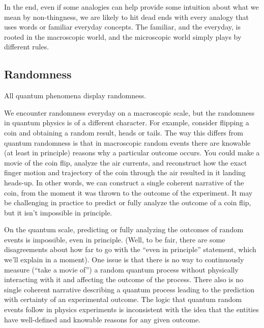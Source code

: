 \documentclass[onecolumn,preprintnumbers,amsmath,amssymbn,reprint,nofootinbib,superscriptaddress]{revtex4}    %
\begin{document}
In the end, even if some analogies can help provide some intuition about what we mean by non-thingness, we are likely to hit dead ends with every analogy that uses words or familiar everyday concepts.  The familiar, and the everyday, is rooted in the macroscopic world, and the microscopic world simply plays by different rules.

\par 
\subsection{Randomness}
%
All quantum phenomena display randomness.  

We encounter randomness everyday on a macroscopic scale, but the randomness in quantum physics is of a different character.  For example, consider flipping a coin and obtaining a random result, heads or tails.  The way this differs from quantum randomness is that in macroscopic random events there are knowable (at least in principle) reasons why a particular outcome occurs.  You could make a movie of the coin flip, analyze the air currents, and reconstruct how the exact finger motion and trajectory of the coin through the air resulted in it landing heads-up.  In other words, we can construct a single coherent narrative of the coin, from the moment it was thrown to the outcome of the experiment.  It may be challenging in practice to predict or fully analyze the outcome of a coin flip, but it isn't impossible in principle. 

On the quantum scale, predicting or fully analyzing the outcomes of random events is impossible, even in principle.  (Well, to be fair, there are some disagreements about how far to go with the ``even in principle'' statement, which we'll explain in a moment).  One issue is that there is no way to continuously measure  (``take a movie of'') a random quantum process without physically interacting with it and affecting the outcome of the process.  There also is no single coherent narrative describing a quantum process leading to the prediction with certainty of an experimental outcome.  The logic that quantum random events follow in physics experiments is inconsistent with the idea that the entities have well-defined and knowable reasons for any given outcome.  
\end{document}
